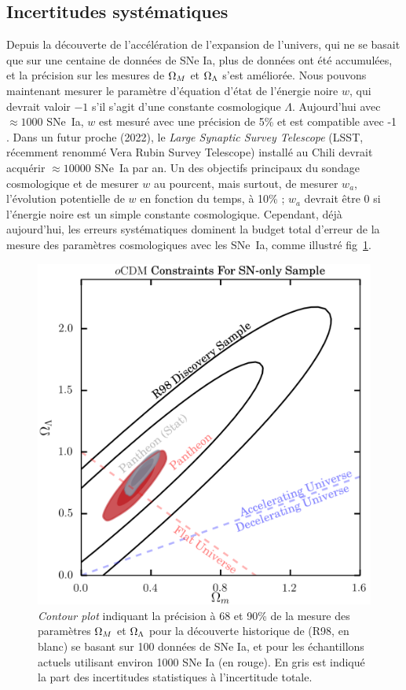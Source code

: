 \documentclass[a4paper, 12pt, svgnames]{article}
\begin{document}
\subsection{Incertitudes systématiques}\label{ssec:syst}

Depuis la découverte de l'accélération de l'expansion de l'univers, qui ne se
basait que sur une centaine de données de SNe Ia, plus de données ont été
accumulées, et la précision sur les mesures de $\Omega_M$ et $\Omega_\Lambda$ s'est
améliorée. Nous pouvons maintenant mesurer le paramètre d'équation d'état de
l'énergie noire $w$, qui devrait valoir $-1$ s'il s'agit d'une constante
cosmologique $\Lambda$. Aujourd'hui avec $\approx1000$ SNe~Ia, $w$ est mesuré
avec une précision de 5\% et est compatible avec -1 \cite{betoule_improved_2014,
scolnic_complete_2018}. Dans un futur proche (2022), le \textit{Large Synaptic
Survey Telescope} (LSST, récemment renommé Vera Rubin Survey Telescope) installé
au Chili devrait acquérir $\approx 10000$ SNe~Ia par an. Un des objectifs
principaux du sondage cosmologique et de mesurer $w$ au pourcent, mais surtout,
de mesurer $w_a$, l'évolution potentielle de $w$ en fonction du temps, à 10\% ;
$w_a$ devrait être 0 si l'énergie noire est un simple constante cosmologique.
Cependant, déjà aujourd'hui, les erreurs systématiques dominent la budget total
d'erreur de la mesure des paramètres cosmologiques avec les SNe~Ia, comme
illustré fig~\ref{fig:scolnic_syst}. \bigbreak

\begin{figure}[htbp!]
    \centering
    \includegraphics[width=.5\linewidth]{Rapport_figures/scolnic_syst.png}
    \captionsetup{justification=centering}
    \caption{\textit{Contour plot} indiquant la précision à 68 et 90\% de la
    mesure des paramètres $\Omega_M$ et $\Omega_\Lambda$ pour la découverte historique de
     (R98, en blanc) se basant sur 100 données de SNe Ia, et
    pour les échantillons actuels utilisant environ 1000 SNe Ia (en rouge). En
    gris est indiqué la part des incertitudes statistiques à l'incertitude
    totale. \cite{scolnic_complete_2018}}
    \label{fig:scolnic_syst}
\end{figure}
\end{document}

